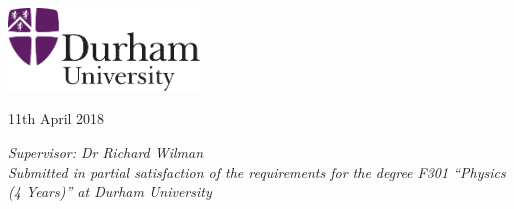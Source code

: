 \documentclass[12pt]{book}
\makeatletter
\providecommand\phantomsection{}%
\newcommand\listofillustrations{%
    \chapter*{List of Tables \& Figures}%
    \phantomsection
    \section*{Figures}%
    \phantomsection
    \@starttoc{lof}%
    \bigskip
    \section*{Tables}%
    \phantomsection
    \@starttoc{lot}}
\makeatother
\begin{document}
{{  
  \begin{center}
    \includegraphics[width=2in]{DU_2-col_sml.pdf}
  \end{center}
  \begin{center}\sffamily\LARGE{11th April 2018}\end{center}

  \thispagestyle{empty}

  \begin{center}
  \large \emph{Supervisor: Dr Richard Wilman}\\
  \vspace{5ex}
  \emph{Submitted in partial satisfaction of the requirements for the degree
F301 ``Physics (4 Years)'' at Durham University}
  \end{center}
}

\endtitlepage


  \tableofcontents
   
  \mainmatter\setcounter{page}{3}
  \raggedbottom
  
  
  
  
  

  \backmatter
  
  \markboth{}{}
  
  


} %
\end{document}
